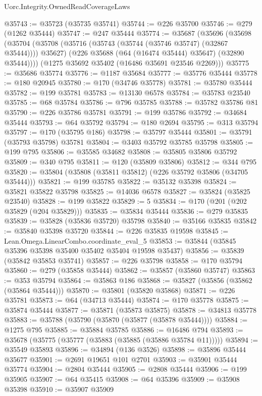 \begin{lexlean}{Uorc.Integrity.OwnedReadCoverageLaws}
\begin{coremodule}
@35743 := @35723 (@35735 @35741)
@35744 := @226 @35700
@35746 := @279 (@1262 @35444)
@35747 := @247 @35444
@35774 := @35687
    (@35696
      (@35698
        (@35704
          (@35708 (@35716 (@35743 (@35744 (@35746 @35747) (@32867 @35444)))) @35627)
          (@226 @35688 (@64 (@16474 @35444) @35647) (@32890 @35444))))
      (@1275 @35692 @35402 (@16486 @35691 @23546 @2269)))
@35775 := @35686 @35774
@35776 := @1187 @35684
@35777 := @35776 @35444
@35778 := @180 @20945
@35780 := @170 (@34746 @35778)
@35781 := @35780 @35444
@35782 := @199 @35781
@35783 := @13130 @6578
@35784 := @35783 @23540
@35785 := @68 @35784
@35786 := @796 @35785
@35788 := @35782 @35786 @81
@35790 := @226 @35786 @35781
@35791 := @199 @35786
@35792 := @34684 @35444
@35793 := @64 @35792
@35794 := @180 @2694
@35795 := @313 @35794
@35797 := @170 (@35795 @186)
@35798 := @35797 @35444
@35801 := @35791 (@35793 @35798) @35781
@35804 := @3403 @35792 @35785 @35798
@35805 := @199 @795
@35806 := @35585 @34682
@35808 := @35805 @35806 @35792
@35809 := @340 @795
@35811 := @120 (@35809 @35806)
@35812 := @344 @795
@35820 := @35804 (@35808 (@35811 @35812) (@226 @35792 @35806 (@34705 @35444)))
@35821 := @199 @35785
@35822 := @35132 @35398
@35824 := @35821 @35822 @35798
@35825 := @14036 @6578
@35827 := @35824 (@35825 @23540)
@35828 := @199 @35822
@35829 := 5
@35834 := @170 (@201 (@202 @35829 (@204 @35829)))
@35835 := @35834 @35444
@35836 := @279 @35835
@35839 := @35828 (@35836 @35720) @35798
@35840 := @35166 @35835
@35842 := @35840 @35398 @35720
@35844 := @226 @35835 @19598
@35845 := Lean.Omega.LinearCombo.coordinate_eval_5
@35853 := @35844 (@35845 @35396 @35398 @35400 @35402 @35404 @19598 @35437)
@35856 := @35839 (@35842 @35853 @35741)
@35857 := @226 @35798
@35858 := @170 @35794
@35860 := @279 (@35858 @35444)
@35862 := @35857 (@35860 @35747)
@35863 := @353 @35794
@35864 := @35863 @186
@35868 := @35827 (@35856 (@35862 (@35864 @35444)))
@35870 := @35801 (@35820 @35868)
@35871 := @226 @35781
@35873 := @64 (@34713 @35444)
@35874 := @170 @35778
@35875 := @35874 @35444
@35877 := @35871 (@35873 @35875)
@35878 := @34813 @35778
@35883 := @35788 (@35790 (@35870 (@35877 (@35878 @35444))))
@35884 := @1275 @795
@35885 := @35884 @35785
@35886 := @16486 @794
@35893 := @35678 (@35775 (@35777 (@35883 (@35885 (@35886 @35784 @11)))))
@35894 := @35549 @35893
@35896 := @34894 (@136 @3526)
@35898 := @35896 @35444 @35677
@35901 := @2691 @19651 @101 @2701
@35903 := @35901 @35444 @35774
@35904 := @2804 @35444
@35905 := @2808 @35444
@35906 := @199 @35905
@35907 := @64 @35415
@35908 := @64 @35396
@35909 := @35908 @35398
@35910 := @35907 @35909

\end{coremodule}
\end{lexlean}
